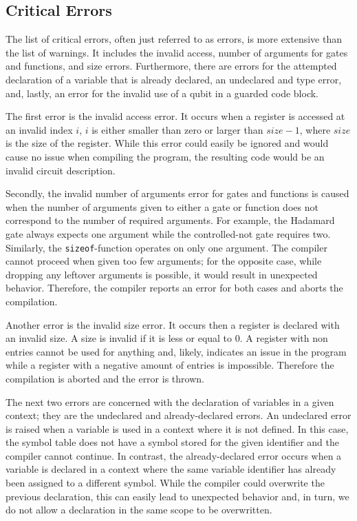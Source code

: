 \subsection{Critical Errors}
The list of critical errors, often just referred to as errors, is more extensive than the list of warnings. It includes the invalid access, number of arguments for gates and functions, and size errors. Furthermore, there are errors for the attempted declaration of a variable that is already declared, an undeclared and type error, and, lastly, an error for the invalid use of a qubit in a guarded code block.

The first error is the invalid access error. It occurs when a register is accessed at an invalid index $i$, \ie $i$ is either smaller than zero or larger than $size - 1$, where $size$ is the size of the register. While this error could easily be ignored and would cause no issue when compiling the program, the resulting code would be an invalid circuit description. 

Secondly, the invalid number of arguments error for gates and functions is caused when the number of arguments given to either a gate or function does not correspond to the number of required arguments. For example, the Hadamard gate always expects one argument while the controlled-not gate requires two. Similarly, the \texttt{sizeof}-function operates on only one argument. The compiler cannot proceed when given too few arguments; for the opposite case, while dropping any leftover arguments is possible, it would result in unexpected behavior. %
Therefore, the compiler reports an error for both cases and aborts the compilation.

Another error is the invalid size error. It occurs then a register is declared with an invalid size. A size is invalid if it is less or equal to $0$. A register with non entries cannot be used for anything and, likely, indicates an issue in the program while a register with a negative amount of entries is impossible. Therefore the compilation is aborted and the error is thrown.

The next two errors are concerned with the declaration of variables in a given context; they are the undeclared and already-declared errors. An undeclared error is raised when a variable is used in a context where it is not defined. In this case, the symbol table does not have a symbol stored for the given identifier and the compiler cannot continue. In contrast, the already-declared error occurs when a variable is declared in a context where the same variable identifier has already been assigned to a different symbol. While the compiler could overwrite the previous declaration, this can easily lead to unexpected behavior and, in turn, we do not allow a declaration in the same scope to be overwritten. 

